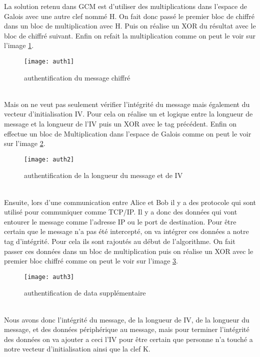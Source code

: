 La solution retenu dans GCM est d'utiliser des multiplications dans l'espace de Galois avec une autre clef nommé H. On fait donc passé le premier bloc de chiffré dans un bloc de multiplication avec H. Puis on réalise un XOR du résultat avec le bloc de chiffré suivant. Enfin on refait la multiplication comme on peut le voir sur l'image \ref{auth1}.

\begin{figure}[!h]
  \centering
  \texttt{[image: auth1]}
  \caption{authentification du message chiffré}
  \label{auth1}
\end{figure}

~\\

Mais on ne veut pas seulement vérifier l'intégrité du message mais également du vecteur d'initialisation IV. Pour cela on réalise un \og et\fg{} logique entre la longueur de message et la longueur de l'IV
puis un XOR avec le tag précédent. Enfin on effectue un bloc de Multiplication dans l'espace de Galois comme on peut le voir sur l'image \ref{auth2}.

\begin{figure}[!h]
  \centering
  \texttt{[image: auth2]}
  \caption{authentification de la longueur du message et de IV}
  \label{auth2}
\end{figure}

~\\

Ensuite, lors d'une communication entre Alice et Bob il y a des protocole qui sont utilisé pour communiquer comme TCP/IP. Il y a donc des données qui vont entourer le message comme l'adresse IP ou le port de destination. Pour être certain que le message n'a pas été intercepté, on va intégrer ces données a notre tag d'intégrité. Pour cela ils sont rajoutés au début de l'algorithme. On fait passer ces données dans un bloc de multiplication puis on réalise un XOR avec le premier bloc chiffré comme on peut le voir sur l'image \ref{auth3}.

\begin{figure}[!h]
  \centering
  \texttt{[image: auth3]}
  \caption{authentification de data supplémentaire}
  \label{auth3}
\end{figure}

~\\

Nous avons donc l'intégrité du message, de la longueur de IV, de la longueur du message, et des données périphérique au message, mais pour terminer l'intégrité des données on va ajouter a ceci l'IV pour être certain que personne n'a touché a notre vecteur d'initialisation ainsi que la clef K.

